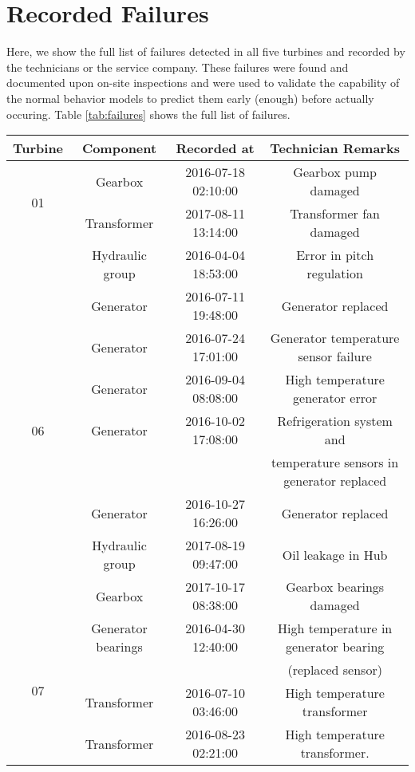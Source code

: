 \chapter{Recorded Failures}
\label{chap:appendix2}
Here, we show the full list of failures detected in all five turbines and recorded by the technicians or the service company.
These failures were found and documented upon on-site inspections and were used to validate the capability of the normal behavior models to 
predict them early (enough) before actually occuring. Table \ref{tab:failures} shows the full list of failures.

\begin{table}[H]
    \centering
    \begin{tabular}{|c|c|c|c|}
    \hline
    \textbf{Turbine} & \textbf{Component} & \textbf{Recorded at} & \textbf{Technician Remarks} \\
    \hline
    \multirow{2}{*}{01} & Gearbox & 2016-07-18 02:10:00 & Gearbox pump damaged \\
    & Transformer & 2017-08-11 13:14:00 & Transformer fan damaged \\
    \hline
    \multirow{9}{*}{06} & Hydraulic group & 2016-04-04 18:53:00 & Error in pitch regulation \\
    & Generator & 2016-07-11 19:48:00 & Generator replaced \\
    & Generator & 2016-07-24 17:01:00 & Generator temperature sensor failure \\
    & Generator & 2016-09-04 08:08:00 & High temperature generator error \\
    & Generator & 2016-10-02 17:08:00 & Refrigeration system and \\
    & & & temperature sensors in generator replaced \\
    & Generator & 2016-10-27 16:26:00 & Generator replaced \\
    & Hydraulic group & 2017-08-19 09:47:00 & Oil leakage in Hub \\
    & Gearbox & 2017-10-17 08:38:00 & Gearbox bearings damaged \\
    \hline
    \multirow{9}{*}{07} & Generator bearings & 2016-04-30 12:40:00 & High temperature in generator bearing \\
    & & & (replaced sensor) \\
    & Transformer & 2016-07-10 03:46:00 & High temperature transformer \\
    & Transformer & 2016-08-23 02:21:00 & High temperature transformer. \\

\end{tabular}
\end{table}
